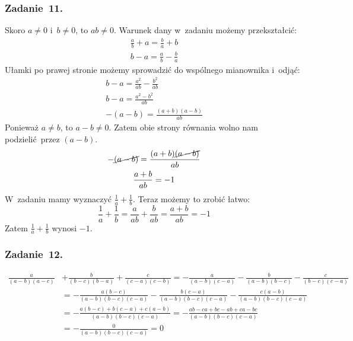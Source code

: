 \subsubsection*{Zadanie~11.}
Skoro \(a \neq 0\) i~\(b \neq 0\), to \(ab \neq 0\). Warunek dany w~zadaniu możemy przekształcić:
\begin{gather*}
    \frac{a}{b} + a = \frac{b}{a} + b\\
    b - a = \frac{a}{b} - \frac{b}{a}
\end{gather*}
Ułamki po prawej stronie możemy sprowadzić do wspólnego mianownika i~odjąć:
\begin{gather*}
    b - a = \frac{a^2}{ab} - \frac{b^2}{ab}\\
    b - a = \frac{a^2 - b^2}{ab}\\
    -(a - b) = \frac{(a + b)(a - b)}{ab}
\end{gather*}
Ponieważ \(a \neq b\), to \(a - b \neq 0\). Zatem obie strony równania wolno nam podzielić przez \((a - b)\).
\begin{gather*}
    -\cancel{(a - b)} = \frac{(a + b)\cancel{(a - b)}}{ab}\\
    \frac{a + b}{ab} = -1
\end{gather*}
W~zadaniu mamy wyznaczyć \(\frac{1}{a} + \frac{1}{b}\). Teraz możemy to zrobić łatwo:
\begin{equation*}
    \frac{1}{a} + \frac{1}{b} = \frac{a}{ab} + \frac{b}{ab} = \frac{a + b}{ab} = -1
\end{equation*}
Zatem \(\frac{1}{a} + \frac{1}{b}\) wynosi \(-1\).
\subsubsection*{Zadanie~12.}
\begin{equation*}
    \begin{split}
        \frac{a}{(a - b)(a - c)} &+ \frac{b}{(b - c)(b - a)} + \frac{c}{(c - a)(c - b)}
            = -\frac{a}{(a - b)(c - a)} - \frac{b}{(a - b)(b - c)} - \frac{c}{(b - c)(c - a)}\\
            &= -\frac{a(b - c)}{(a - b)(b - c)(c - a)} - \frac{b(c - a)}{(a - b)(b - c)(c - a)} - \frac{c(a - b)}{(a - b)(b - c)(c - a)}\\
            &= -\frac{a(b - c) + b(c - a) + c(a - b)}{(a - b)(b - c)(c - a)}
            = -\frac{ab - ca + bc - ab + ca - bc}{(a - b)(b - c)(c - a)}\\
            &= -\frac{0}{(a - b)(b - c)(c - a)}
            = 0
    \end{split}
\end{equation*}
